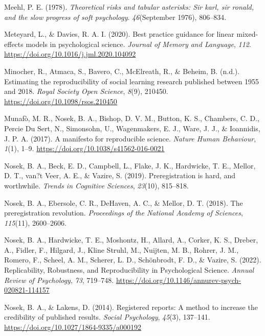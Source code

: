 \documentclass[
  letterpaper,
  DIV=11,
  numbers=noendperiod]{scrreprt}
\newlength{\cslhangindent}
\newlength{\cslentryspacingunit} %
\newenvironment{CSLReferences}[2] %
 {%
  \setlength{\parindent}{0pt}
  \ifodd #1
  \let\oldpar\par
  \def\par{\hangindent=\cslhangindent\oldpar}
  \fi
  \setlength{\parskip}{#2\cslentryspacingunit}
 }%
 {}
\begin{document}
\begin{CSLReferences}{1}{0}
\leavevmode{}%
Meehl, P. E. (1978). \emph{Theoretical risks and tabular asterisks: Sir
karl, sir ronald, and the slow progress of soft psychology}.
\emph{46}(September 1976), 806--834.

\leavevmode{}%
Meteyard, L., \& Davies, R. A. I. (2020). Best practice guidance for
linear mixed-effects models in psychological science. \emph{Journal of
Memory and Language}, \emph{112}.
\url{https://doi.org/10.1016/j.jml.2020.104092}

\leavevmode{}%
Minocher, R., Atmaca, S., Bavero, C., McElreath, R., \& Beheim, B.
(n.d.). Estimating the reproducibility of social learning research
published between 1955 and 2018. \emph{Royal Society Open Science},
\emph{8}(9), 210450. \url{https://doi.org/10.1098/rsos.210450}

\leavevmode{}%
Munafò, M. R., Nosek, B. A., Bishop, D. V. M., Button, K. S., Chambers,
C. D., Percie Du Sert, N., Simonsohn, U., Wagenmakers, E. J., Ware, J.
J., \& Ioannidis, J. P. A. (2017). A manifesto for reproducible science.
\emph{Nature Human Behaviour}, \emph{1}(1), 1--9.
\url{https://doi.org/10.1038/s41562-016-0021}

\leavevmode{}%
Nosek, B. A., Beck, E. D., Campbell, L., Flake, J. K., Hardwicke, T. E.,
Mellor, D. T., van?t Veer, A. E., \& Vazire, S. (2019). Preregistration
is hard, and worthwhile. \emph{Trends in Cognitive Sciences},
\emph{23}(10), 815--818.

\leavevmode{}%
Nosek, B. A., Ebersole, C. R., DeHaven, A. C., \& Mellor, D. T. (2018).
The preregistration revolution. \emph{Proceedings of the National
Academy of Sciences}, \emph{115}(11), 2600--2606.

\leavevmode{}%
Nosek, B. A., Hardwicke, T. E., Moshontz, H., Allard, A., Corker, K. S.,
Dreber, A., Fidler, F., Hilgard, J., Kline Struhl, M., Nuijten, M. B.,
Rohrer, J. M., Romero, F., Scheel, A. M., Scherer, L. D., Schönbrodt, F.
D., \& Vazire, S. (2022). Replicability, Robustness, and Reproducibility
in Psychological Science. \emph{Annual Review of Psychology}, \emph{73},
719--748. \url{https://doi.org/10.1146/annurev-psych-020821-114157}

\leavevmode{}%
Nosek, B. A., \& Lakens, D. (2014). Registered reports: A method to
increase the credibility of published results. \emph{Social Psychology},
\emph{45}(3), 137--141. \url{https://doi.org/10.1027/1864-9335/a000192}


\end{CSLReferences}
\end{document}

